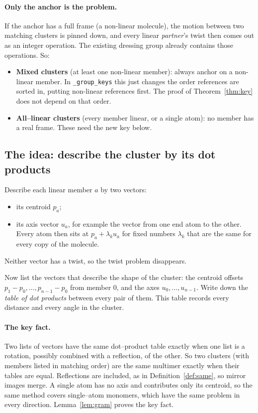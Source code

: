 \documentclass[11pt]{article}
\theoremstyle{definition}
\begin{document}
\paragraph{Only the anchor is the problem.} If the anchor has a full frame (a
non-linear molecule), the motion between two matching clusters is pinned down,
and every linear \emph{partner}'s twist then comes out as an integer operation.
The existing dressing group already contains those operations. So:
\begin{itemize}[leftmargin=2em]
\item \textbf{Mixed clusters} (at least one non-linear member): always anchor
  on a non-linear member. In \texttt{\_group\_keys} this just changes the order
  references are sorted in, putting non-linear references first. The proof of
  Theorem~\ref{thm:key} does not depend on that order.
\item \textbf{All--linear clusters} (every member linear, or a single atom): no
  member has a real frame. These need the new key below.
\end{itemize}

\subsection{The idea: describe the cluster by its dot products}

Describe each linear member $a$ by two vectors:
\begin{itemize}[leftmargin=2em]
\item its centroid $p_a$;
\item its axis vector $u_a$, for example the vector from one end atom to the
  other. Every atom then sits at $p_a+\lambda_k u_a$ for fixed numbers
  $\lambda_k$ that are the same for every copy of the molecule.
\end{itemize}
Neither vector has a twist, so the twist problem disappears.

Now list the vectors that describe the shape of the cluster: the centroid
offsets $p_1-p_0,\dots,p_{n-1}-p_0$ from member $0$, and the axes
$u_0,\dots,u_{n-1}$. Write down the \emph{table of dot products} between every
pair of them. This table records every distance and every angle in the cluster.

\paragraph{The key fact.} Two lists of vectors have the same dot--product table
exactly when one list is a rotation, possibly combined with a reflection, of the
other. So two clusters (with members listed in matching order) are the same
multimer exactly when their tables are equal. Reflections are included, as in
Definition~\ref{def:same}, so mirror images merge. A single atom has no axis and
contributes only its centroid, so the same method covers single--atom
monomers, which have the same problem in every direction.
Lemma~\ref{lem:gram} proves the key fact.
\end{document}
